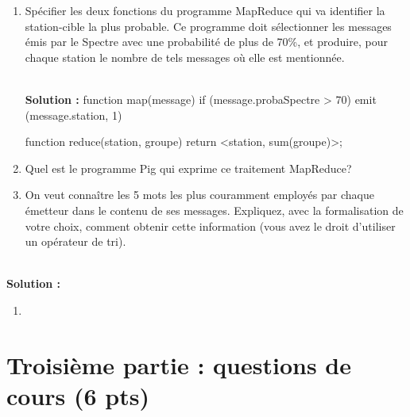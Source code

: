 \documentclass[11pt,a4paper]{article}
\newenvironment{solution}[0]{
~\\ \color{red} \textbf{Solution : }\color{black}}{%
}
\begin{document}
\begin{enumerate}
  \item Spécifier les deux fonctions du programme MapReduce qui
      va identifier la station-cible la plus probable. Ce programme doit sélectionner
     les messages émis par le Spectre avec une probabilité de plus de 70\%,  et produire, 
     pour chaque station le nombre de tels messages où elle est mentionnée.

\begin{solution}
function map(message)
{
if (message.probaSpectre > 70) {
emit (message.station, 1)
}
}

function reduce(station, groupe)
{
return <station, sum(groupe)>;
}
\end{solution}


  \item Quel est le programme Pig qui exprime ce traitement MapReduce?
  
  \item On veut connaître les 5 mots les plus couramment employés par 
   chaque émetteur dans le contenu de ses messages. Expliquez, avec la formalisation 
      de votre choix, comment obtenir cette information (vous avez le droit 
      d'utiliser un opérateur de tri).
\end{enumerate}


\begin{solution}
\begin{enumerate}
 \item 
\end{enumerate}
\end{solution}

\section*{Troisième partie : questions de cours (6 pts)}
\end{document}
